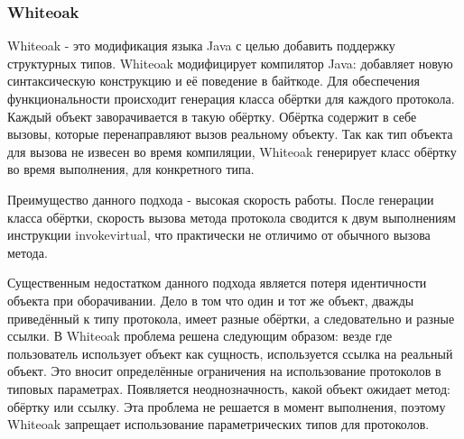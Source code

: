\subsubsection{Whiteoak}
Whiteoak - это модификация языка Java с целью добавить поддержку структурных типов. Whiteoak модифицирует компилятор Java: добавляет новую синтаксическую конструкцию и её поведение в байткоде. Для обеспечения функциональности происходит генерация класса обёртки для каждого протокола. Каждый объект заворачивается в такую обёртку. Обёртка содержит в себе вызовы, которые перенаправляют вызов реальному объекту. Так как тип объекта для вызова не извесен во время компиляции, Whiteoak генерирует класс обёртку во время выполнения, для конкретного типа.

Преимущество данного подхода - высокая скорость работы. После генерации класса обёртки, скорость вызова метода протокола сводится к двум выполнениям инструкции invokevirtual, что практически не отличимо от обычного вызова метода.

Существенным недостатком данного подхода является потеря идентичности объекта при оборачивании. Дело в том что один и тот же объект, дважды приведённый к типу протокола, имеет разные обёртки, а следовательно и разные ссылки. В Whiteoak проблема решена следующим образом: везде где пользователь использует объект как сущность, используется ссылка на реальный объект. Это вносит определённые ограничения на использование протоколов в типовых параметрах. Появляется неоднозначность, какой объект ожидает метод: обёртку или ссылку. Эта проблема не решается в момент выполнения, поэтому Whiteoak запрещает использование параметрических типов для протоколов.

